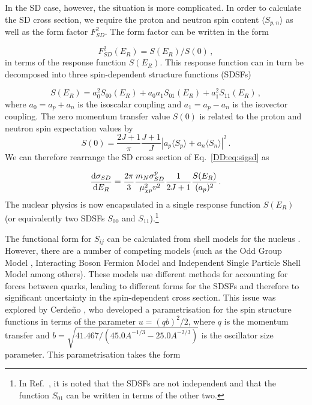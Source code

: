 In the SD case, however, the situation is more complicated. In order to calculate the SD cross section, we require the proton and neutron spin content $\langle S_{p,n} \rangle$ as well as the form factor $F_{SD}^2$. The form factor can be written in the form

\begin{equation}
F_{SD}^2(E_R) = S(E_R)/S(0)\,,
\end{equation}
in terms of the response function $S(E_R)$. This response function can in turn be decomposed into three spin-dependent structure functions (SDSFs)

\begin{equation}
S(E_R) = a_0^2S_{00}(E_R) + a_0a_1S_{01}(E_R) + a_1^2S_{11}(E_R)\,,
\end{equation}
where $a_0 = a_p + a_n$ is the isoscalar coupling and $a_1 = a_p - a_n$ is the isovector coupling. The zero momentum transfer value $S(0)$ is related to the proton and neutron spin expectation values by \cite{Cannoni:2013}
\begin{equation}
S(0) = \frac{2J + 1}{\pi} \frac{J+1}{J} \left|a_p\langle S_p \rangle + a_n \langle S_n \rangle\right|^2\,.
\end{equation}
We can therefore rearrange the SD cross section of Eq.~\ref{DD:eq:sigsd} as

\begin{equation}
\frac{\mathrm{d}\sigma_{SD}}{\mathrm{d}E_R} = \frac{2\pi}{3} \frac{m_N \sigma_{SD}^p}{\mu_{\chi p}^2 v^2} \frac{1}{2J+1} \frac{S(E_R)}{(a_p)^2}\,.
\end{equation}
The nuclear physics is now encapsulated in a single response function $S(E_R)$ (or equivalently two SDSFs $S_{00}$ and $S_{11}$).\footnote{In Ref.~\cite{Cannoni:2013}, it is noted that the SDSFs are not independent and that the function $S_{01}$ can be written in terms of the other two.}

The functional form for $S_{ij}$ can be calculated from shell models for the nucleus \cite{Ressell:1997}. However, there are a number of competing models (such as the Odd Group Model \cite{Engel:1989}, Interacting Boson Fermion Model \cite{Iachello:1991} and Independent Single Particle Shell Model \cite{Ellis:1988} among others). These models use different methods for accounting for forces between quarks, leading to different forms for the SDSFs and therefore to significant uncertainty in the spin-dependent cross section. This issue was explored by Cerde\~{n}o \etal \cite{Cerdeno:2012}, who developed a parametrisation for the spin structure functions in terms of the parameter $u = (qb)^2/2$, where $q$ is the momentum transfer and $b = \sqrt{41.467/(45.0 A^{-1/3} - 25.0 A^{-2/3})}$ is the oscillator size parameter. This parametrisation takes the form

